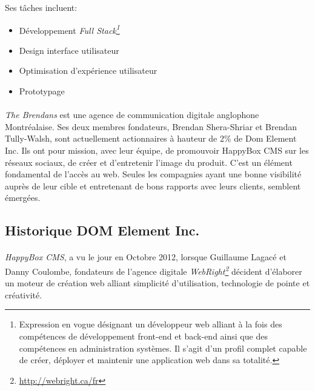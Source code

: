 \documentclass[11pt, a4paper ]{article}
\begin{document}
\begin{spacing}{1.5}
	Ses tâches incluent:

		\begin{itemize}

			\item
				Développement \emph{Full Stack\footnote{Expression en vogue désignant un développeur web alliant à la fois des compétences de développement front-end et back-end ainsi que des compétences en administration systèmes. Il s'agit d'un profil complet capable de créer, déployer et maintenir une application web dans sa totalité.}}
			\item
				Design interface utilisateur
			\item
				Optimisation d'expérience utilisateur
			\item
				Prototypage

		\end{itemize}



\paragraph{} %
	\emph{The Brendans} est une agence de communication digitale anglophone Montréalaise. Ses deux membres fondateurs, Brendan Shera-Shriar et Brendan Tully-Walsh, sont actuellement actionnaires à hauteur de 2\% de Dom Element Inc. Ils ont pour mission, avec leur équipe, de promouvoir HappyBox CMS sur les réseaux sociaux, de créer et d'entretenir l'image du produit.
	C'est un élément fondamental de l'accès au web. Seules les compagnies ayant une bonne visibilité auprès de leur cible et entretenant de bons rapports avec leurs clients, semblent émergées.

		\subsection{Historique DOM Element Inc.}

\paragraph{}
\emph{HappyBox CMS}, a vu le jour en Octobre 2012, lorsque Guillaume Lagacé et Danny Coulombe, fondateurs de l'agence digitale \emph{WebRight\footnote{\url{http://webright.ca/fr}}} décident d'élaborer un moteur de création web alliant simplicité d'utilisation, technologie de pointe et créativité.


\end{spacing}
\end{document}
